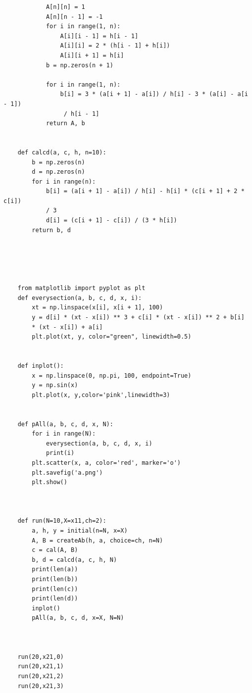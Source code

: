 \documentclass[UTF8]{ctexart}
\begin{document}
\begin{lstlisting}
	        A[n][n] = 1
	        A[n][n - 1] = -1
	        for i in range(1, n):
	            A[i][i - 1] = h[i - 1]
	            A[i][i] = 2 * (h[i - 1] + h[i])
	            A[i][i + 1] = h[i]
	        b = np.zeros(n + 1)

	        for i in range(1, n):
	            b[i] = 3 * (a[i + 1] - a[i]) / h[i] - 3 * (a[i] - a[i - 1])
	             / h[i - 1]
	        return A, b


	def calcd(a, c, h, n=10):
	    b = np.zeros(n)
	    d = np.zeros(n)
	    for i in range(n):
	        b[i] = (a[i + 1] - a[i]) / h[i] - h[i] * (c[i + 1] + 2 * c[i]) 
	        / 3
	        d[i] = (c[i + 1] - c[i]) / (3 * h[i])
	    return b, d





	from matplotlib import pyplot as plt
	def everysection(a, b, c, d, x, i):
	    xt = np.linspace(x[i], x[i + 1], 100)
	    y = d[i] * (xt - x[i]) ** 3 + c[i] * (xt - x[i]) ** 2 + b[i] 
	    * (xt - x[i]) + a[i]
	    plt.plot(xt, y, color="green", linewidth=0.5)


	def inplot():
	    x = np.linspace(0, np.pi, 100, endpoint=True)
	    y = np.sin(x)
	    plt.plot(x, y,color='pink',linewidth=3)


	def pAll(a, b, c, d, x, N):
	    for i in range(N):
	        everysection(a, b, c, d, x, i)
	        print(i)
	    plt.scatter(x, a, color='red', marker='o')
	    plt.savefig('a.png')
	    plt.show()



	def run(N=10,X=x11,ch=2):
	    a, h, y = initial(n=N, x=X)
	    A, B = createAb(h, a, choice=ch, n=N)
	    c = cal(A, B)
	    b, d = calcd(a, c, h, N)
	    print(len(a))
	    print(len(b))
	    print(len(c))
	    print(len(d))
	    inplot()
	    pAll(a, b, c, d, x=X, N=N)



	run(20,x21,0)
	run(20,x21,1)
	run(20,x21,2)
	run(20,x21,3)

\end{lstlisting}
\end{document}
